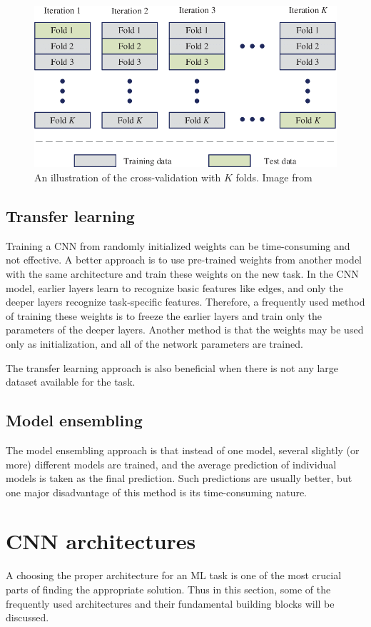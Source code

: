 \documentclass[thesis=B,english]{FITthesis}[2019/12/23]
\begin{document}
\begin{figure}[ht]
		\includegraphics[scale=0.4]{images/cross_validation.png}
		\centering
		\caption{An illustration of the cross-validation with $K$ folds. Image from \cite{ren_li_han_2019}}
\end{figure}

\subsection{Transfer learning}
Training a CNN from randomly initialized weights can be time-consuming and not effective. A better approach is to use pre-trained weights from another model with the same architecture and train these weights on the new task. In the CNN model, earlier layers learn to recognize basic features like edges, and only the deeper layers recognize task-specific features. Therefore, a frequently used method of training these weights is to freeze the earlier layers and train only the parameters of the deeper layers. Another method is that the weights may be used only as initialization, and all of the network parameters are trained.

The transfer learning approach is also beneficial when there is not any large dataset available for the task.

\subsection{Model ensembling}
The model ensembling approach is that instead of one model, several slightly (or more) different models are trained, and the average prediction of individual models is taken as the final prediction. Such predictions are usually better, but one major disadvantage of this method is its time-consuming nature.

\section{CNN architectures}
A choosing the proper architecture for an ML task is one of the most crucial parts of finding the appropriate solution. Thus in this section, some of the frequently used architectures and their fundamental building blocks will be discussed.
\end{document}

